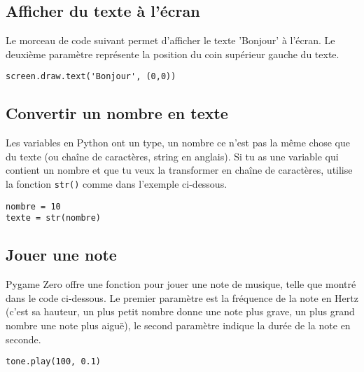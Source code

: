 \documentclass[11pt]{article}
\begin{document}
\subsection*{Afficher du texte à l'écran}

Le morceau de code suivant permet d'afficher le texte 'Bonjour' à l'écran. Le deuxième paramètre représente la position du coin supérieur gauche du texte.

\begin{lstlisting}
screen.draw.text('Bonjour', (0,0))
\end{lstlisting}

\subsection*{Convertir un nombre en texte}

Les variables en Python ont un type, un nombre ce n'est pas la même chose que du texte (ou chaîne de caractères, string en anglais). Si tu as une variable qui contient un nombre et que tu veux la transformer en chaîne de caractères, utilise la fonction \lstinline{str()} comme dans l'exemple ci-dessous.

\begin{lstlisting}
nombre = 10
texte = str(nombre)
\end{lstlisting}

\subsection*{Jouer une note}

Pygame Zero offre une fonction pour jouer une note de musique, telle que montré dans le code ci-dessous. Le premier paramètre est la fréquence de la note en Hertz (c'est sa hauteur, un plus petit nombre donne une note plus grave, un plus grand nombre une note plus aiguë), le second paramètre indique la durée de la note en seconde.

\begin{lstlisting}
tone.play(100, 0.1)
\end{lstlisting}
\end{document}
